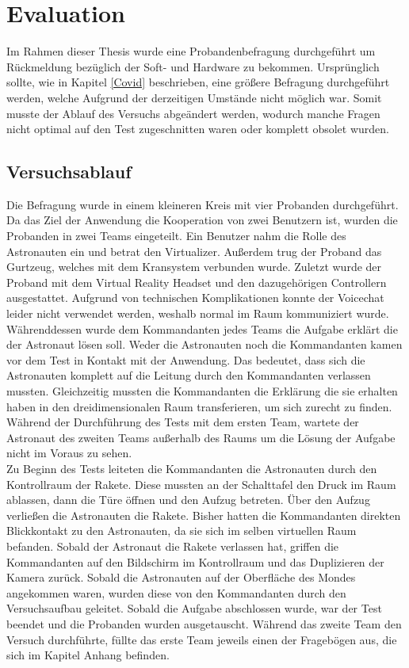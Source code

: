 \section{Evaluation} \label{Evaluation}
Im Rahmen dieser Thesis wurde eine Probandenbefragung durchgeführt um Rückmeldung bezüglich der Soft- und Hardware zu bekommen. Ursprünglich sollte, wie in Kapitel \ref{Covid} beschrieben, eine größere Befragung durchgeführt werden, welche Aufgrund der derzeitigen Umstände nicht möglich war. Somit musste der Ablauf des Versuchs abgeändert werden, wodurch manche Fragen nicht optimal auf den Test zugeschnitten waren oder komplett obsolet wurden. 

\subsection{Versuchsablauf}
Die Befragung wurde in einem kleineren Kreis mit vier Probanden durchgeführt. Da das Ziel der Anwendung die Kooperation von zwei Benutzern ist, wurden die Probanden in zwei Teams eingeteilt. Ein Benutzer nahm die Rolle des Astronauten ein und betrat den Virtualizer. Außerdem trug der Proband das Gurtzeug, welches mit dem Kransystem verbunden wurde. Zuletzt wurde der Proband mit dem Virtual Reality Headset und den dazugehörigen Controllern ausgestattet. Aufgrund von technischen Komplikationen konnte der Voicechat leider nicht verwendet werden, weshalb normal im Raum kommuniziert wurde.\\

Währenddessen wurde dem Kommandanten jedes Teams die Aufgabe erklärt die der Astronaut lösen soll. Weder die Astronauten noch die Kommandanten kamen vor dem Test in Kontakt mit der Anwendung. Das bedeutet, dass sich die Astronauten komplett auf die Leitung durch den Kommandanten verlassen mussten. Gleichzeitig mussten die Kommandanten die Erklärung die sie erhalten haben in den dreidimensionalen Raum transferieren, um sich zurecht zu finden. Während der Durchführung des Tests mit dem ersten Team, wartete der Astronaut des zweiten Teams außerhalb des Raums um die Lösung der Aufgabe nicht im Voraus zu sehen.\\

Zu Beginn des Tests leiteten die Kommandanten die Astronauten durch den Kontrollraum der Rakete. Diese mussten an der Schalttafel den Druck im Raum ablassen, dann die Türe öffnen und den Aufzug betreten. Über den Aufzug verließen die Astronauten die Rakete. Bisher hatten die Kommandanten direkten Blickkontakt zu den Astronauten, da sie sich im selben virtuellen Raum befanden. Sobald der Astronaut die Rakete verlassen hat, griffen die Kommandanten auf den Bildschirm im Kontrollraum und das Duplizieren der Kamera zurück. Sobald die Astronauten auf der Oberfläche des Mondes angekommen waren, wurden diese von den Kommandanten durch den Versuchsaufbau geleitet. Sobald die Aufgabe abschlossen wurde, war der Test beendet und die Probanden wurden ausgetauscht. Während das zweite Team den Versuch durchführte, füllte das erste Team jeweils einen der Fragebögen aus, die sich im Kapitel Anhang befinden. 

